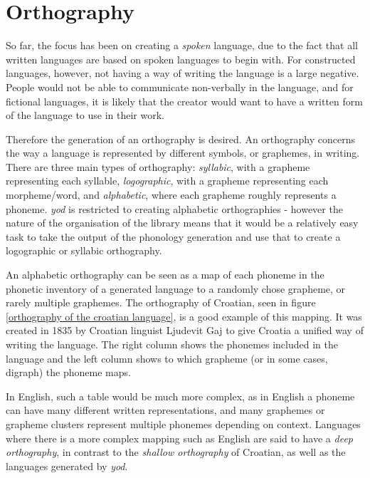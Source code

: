 \documentclass{report}
\begin{document}
	\chapter{Orthography}
	\label{chapter: orthography}
	
	So far, the focus has been on creating a \textit{spoken} language, due to the fact that all written languages are based on spoken languages to begin with. For constructed languages, however, not having a way of writing the language is a large negative. People would not be able to communicate non-verbally in the language, and for fictional languages, it is likely that the creator would want to have a written form of the language to use in their work.
	
	Therefore the generation of an orthography is desired. An orthography concerns the way a language is represented by different symbols, or graphemes, in writing. There are three main types of orthography: \textit{syllabic}, with a grapheme representing each syllable, \textit{logographic}, with a grapheme representing each morpheme/word, and \textit{alphabetic}, where each grapheme roughly represents a phoneme. \textit{yod} is restricted to creating alphabetic orthographies - however the nature of the organisation of the library means that it would be a relatively easy task to take the output of the phonology generation and use that to create a logographic or syllabic orthography.
	
	An alphabetic orthography can be seen as a map of each phoneme in the phonetic inventory of a generated language to a randomly chose grapheme, or rarely multiple graphemes. The orthography of Croatian, seen in figure \ref{orthography of the croatian language}, is a good example of this mapping. It was created in 1835 by Croatian linguist Ljudevit Gaj to give Croatia a unified way of writing the language. The right column shows the phonemes included in the language and the left column shows to which grapheme (or in some cases, digraph) the phoneme maps.
	
	In English, such a table would be much more complex, as in English a phoneme can have many different written representations, and many graphemes or grapheme clusters represent multiple phonemes depending on context. Languages where there is a more complex mapping such as English are said to have a \textit{deep orthography}, in contrast to the \textit{shallow orthography} of Croatian, as well as the languages generated by \textit{yod}.
	
\end{document}
